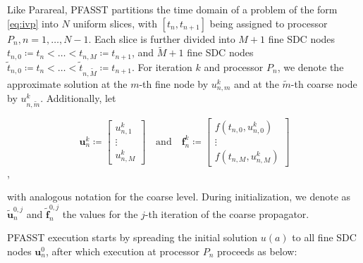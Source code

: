 Like Parareal, PFASST partitions the time domain of a problem of the form \ref{eq:ivp} into \(N\) uniform slices, with \([t_n, t_{n+1}]\) being assigned to processor \(P_n, n = 1,\dots,N-1\). Each slice is further divided into \(M+1\) fine SDC nodes \(t_{n,0} \coloneqq t_n < \dots < t_{n,M} \coloneqq t_{n+1}\), and \(\tilde{M}+1\) fine SDC nodes \(\tilde{t}_{n,0} \coloneqq t_n < \dots < \tilde{t}_{n,\tilde{M}} \coloneqq t_{n+1}\). For iteration \(k\) and processor \(P_n\), we denote the approximate solution at the \(m\)-th fine node by \(u^k_{n,m}\) and at the \(\tilde{m}\)-th coarse node by  \(u^k_{n,\tilde{m}}\). Additionally, let

\begin{equation}
    \bm{u}^k_n \coloneqq 
    \begin{bmatrix}
        u^k_{n,1} \\ \vdots \\ u^k_{n,M} %
    \end{bmatrix}
    \quad \text{and} \quad
    \bm{f}^k_n \coloneqq
    \begin{bmatrix}
        f(t_{n,0}, u^k_{n,0}) \\ \vdots \\ f(t_{n,M}, u^k_{n,M})
    \end{bmatrix}
\end{equation},

with analogous notation for the coarse level. During initialization, we denote as \(\bm{\tilde{u}}^{0,j}_n\) and \(\bm{\tilde{f}}^{0,j}_n\) the values for the \(j\)-th iteration of the coarse propagator.

PFASST execution starts by spreading the initial solution \(u(a)\) to all fine SDC nodes \(\bm{u}^0_n\), after which execution at processor \(P_n\) proceeds as below:

